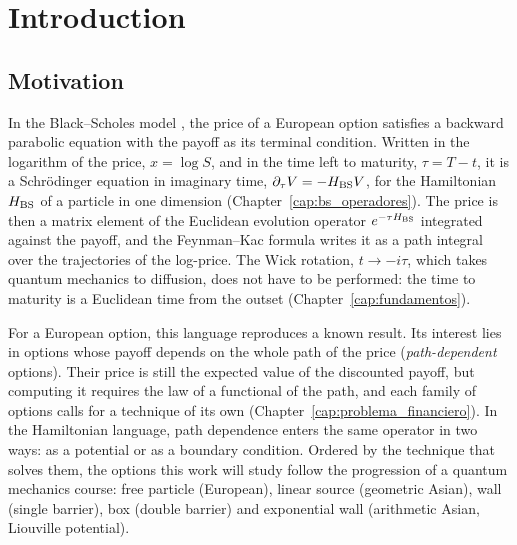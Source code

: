 \chapter{Introduction}\label{cap:intro}

\section{Motivation}
\label{sec:motivacion}

In the Black--Scholes model \cite{black-scholes, merton1973}, the price
of a European option satisfies a backward parabolic equation with the
payoff as its terminal condition. Written in the logarithm of the price,
$x = \log S$, and in the time left to maturity, $\tau = T - t$, it is a
Schrödinger equation in imaginary time, $\partial_\tau V = -H_{\text{BS}} V$, for
the Hamiltonian $H_{\text{BS}}$ of a particle in one dimension
(Chapter~\ref{cap:bs_operadores}\enprep). The price is then a matrix
element of the Euclidean evolution operator $e^{-\tau H_{\text{BS}}}$ integrated
against the payoff, and the Feynman--Kac formula \cite{kac1949} writes
it as a path integral over the trajectories of the
log-price. The Wick rotation, $t \to -i\tau$, which
takes quantum mechanics to diffusion, does not have to be performed: the
time to maturity is a Euclidean time from the outset
(Chapter~\ref{cap:fundamentos}\enprep).

\medskip

For a European option, this language reproduces a known result. Its
interest lies in options whose payoff depends on the whole path of the
price (\emph{path-dependent} options). Their price is still the expected
value of the discounted payoff, but computing it requires the law of a
functional of the path, and each family of options calls for a
technique of its own (Chapter~\ref{cap:problema_financiero}). In
the Hamiltonian language, path dependence enters the same operator in
two ways: as a potential or as a boundary condition. Ordered by the
technique that solves them, the options this work will study follow the
progression of a quantum mechanics course: free particle (European),
linear source (geometric Asian), wall (single barrier), box (double
barrier) and exponential wall (arithmetic Asian, Liouville potential).

\medskip

